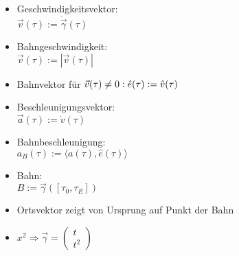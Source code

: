 \begin{minipage}{0.5\linewidth}
    \begin{itemize}
        \item Geschwindigkeitsvektor:\\ $\vec{v}(\tau) := \dot{\vec{\gamma}}(\tau)$
        \item Bahngeschwindigkeit:\\ $\vec{v}(\tau) := \left|\vec{v}(\tau)\right|$
        \item Bahnvektor für $\vec{v}(\tau) \ne 0:\\ \hat{e}(\tau) := \hat{v}(\tau)$
        \item Beschleunigungsvektor:\\ $\vec{a}(\tau) := \dot{v}(\tau)$
    \end{itemize}
\end{minipage}
\begin{minipage}{0.5\linewidth}
    \begin{itemize}
        \item Bahnbeschleunigung:\\ $a_B(\tau) := \langle a(\tau), \hat{e}(\tau)⟩$
        \item Bahn:\\ $B := \vec{\gamma}(\left[\tau_0, \tau_E\right])$
        \item Ortsvektor zeigt von Ursprung auf Punkt der Bahn
        \item $x^2 \Rightarrow \vec{\gamma} = \left(\begin{matrix}
            t\\
            t^2
        \end{matrix}\right)$
    \end{itemize}
\end{minipage}